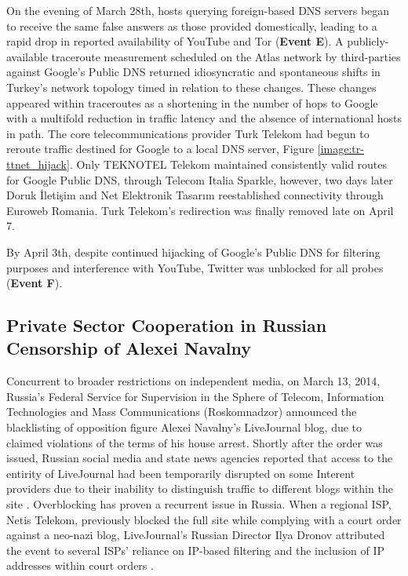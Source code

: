 On the evening of March 28th, hosts querying foreign-based DNS servers began to receive the same false answers as those provided domestically, leading to a rapid drop in reported availability of YouTube and Tor (\textbf{Event E}). A publicly-available traceroute measurement scheduled on the Atlas network by third-parties against Google's Public DNS returned idiosyncratic and spontaneous shifts in Turkey's network topology timed in relation to these changes. These changes appeared within traceroutes as a shortening in the number of hops to Google with a multifold reduction in traffic latency and the absence of international hosts in path. The core telecommunications provider Turk Telekom had begun to reroute traffic destined for Google to a local DNS server, Figure \ref{image:tr-ttnet_hijack}. Only TEKNOTEL Telekom maintained consistently valid routes for Google Public DNS, through Telecom Italia Sparkle, however, two days later Doruk \.{I}leti\c{s}im and Net Elektronik Tasar{\i}m reestablished connectivity through Euroweb Romania. Turk Telekom's redirection was finally removed late on April 7.

By April 3th, despite continued hijacking of Google's Public DNS for filtering purposes and interference with YouTube, Twitter was unblocked for all probes (\textbf{Event F}).

\subsection{Private Sector Cooperation in Russian Censorship of Alexei Navalny}

Concurrent to broader restrictions on independent media, on March 13, 2014, Russia's Federal Service for Supervision in the Sphere of Telecom, Information Technologies and Mass Communications (Roskomnadzor) announced the blacklisting of opposition figure Alexei Navalny's LiveJournal blog, due to claimed violations of the terms of his house arrest. Shortly after the order was issued, Russian social media and state news agencies reported that access to the entirity of LiveJournal had been temporarily disrupted on some Interent providers due to their inability to distinguish traffic to different blogs within the site \cite{itar2014livejournal}. Overblocking has proven a recurrent issue in Russia. When a regional ISP, Netis Telekom, previously blocked the full site while complying with a court order against a neo-nazi blog, LiveJournal's Russian Director Ilya Dronov attributed the event to several ISPs' reliance on IP-based filtering and the inclusion of IP addresses within court orders \cite{leta2012livejoural}. 

